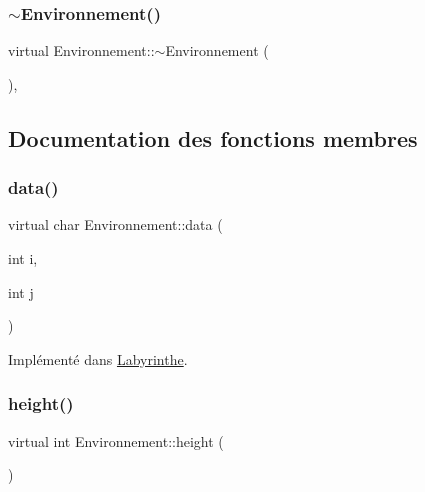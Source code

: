 \subsubsection{\texorpdfstring{$\sim$\+Environnement()}{~Environnement()}}
{\footnotesize\ttfamily virtual Environnement\+::$\sim$\+Environnement (\begin{DoxyParamCaption}{ }\end{DoxyParamCaption})\hspace{0.3cm}{\ttfamily [inline]}, {\ttfamily [virtual]}}



\subsection{Documentation des fonctions membres}
\mbox{\label{classEnvironnement_a0fae4716da729dbf13f52f09f2d293cd}} 
\subsubsection{\texorpdfstring{data()}{data()}}
{\footnotesize\ttfamily virtual char Environnement\+::data (\begin{DoxyParamCaption}\item[{int}]{i,  }\item[{int}]{j }\end{DoxyParamCaption})\hspace{0.3cm}{\ttfamily [pure virtual]}}



Implémenté dans \hyperlink{classLabyrinthe_a433936ae60ddf3f0b85a407f414b8d38}{Labyrinthe}.

\mbox{\label{classEnvironnement_af7629ab7f15ec65476eadcc80c46b50c}} 
\subsubsection{\texorpdfstring{height()}{height()}}
{\footnotesize\ttfamily virtual int Environnement\+::height (\begin{DoxyParamCaption}{ }\end{DoxyParamCaption})\hspace{0.3cm}{\ttfamily [pure virtual]}}



